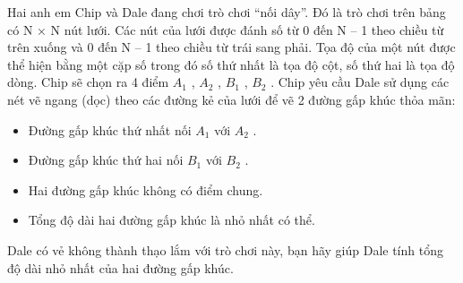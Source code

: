 Hai anh em Chip và Dale đang chơi trò chơi “nối dây”. Đó là trò chơi trên bảng có N × N nút lưới. Các nút của lưới được đánh số từ 0 đến N – 1 theo chiều từ trên xuống và 0 đến N – 1 theo chiều từ trái sang phải. Tọa độ của một nút được thể hiện bằng một cặp số trong đó số thứ nhất là tọa độ cột, số thứ hai là tọa độ dòng. Chip sẽ chọn ra 4 điểm $A_{1}$ , $A_{2}$ , $B_{1}$ , $B_{2}$ . Chip yêu cầu Dale sử dụng các nét vẽ ngang (dọc) theo các đường kẻ của lưới để vẽ 2 đường gấp khúc thỏa mãn:
\begin{itemize}
	\item Đường gấp khúc thứ nhất nối $A_{1}$ với $A_{2}$ .
	\item Đường gấp khúc thứ hai nối $B_{1}$ với $B_{2}$ .
	\item Hai đường gấp khúc không có điểm chung.
	\item Tổng độ dài hai đường gấp khúc là nhỏ nhất có thể.
\end{itemize}

Dale có vẻ không thành thạo lắm với trò chơi này, bạn hãy giúp Dale tính tổng độ dài nhỏ nhất của hai đường gấp khúc.